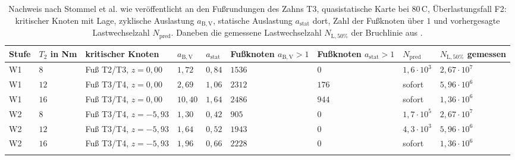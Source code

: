\begin{table}[htbp]
    \caption{Nachweis nach Stommel et al. wie veröffentlicht an den Fußrundungen des Zahns T3, quasistatische Karte bei $80$\,\textdegree C, Überlastungsfall F2: kritischer Knoten mit Lage, zyklische Auslastung $a_{\mathrm{B,V}}$, statische Auslastung $a_{\mathrm{stat}}$ dort, Zahl der Fußknoten über $1$ und vorhergesagte Lastwechselzahl $N_{\mathrm{pred}}$. Daneben die gemessene Lastwechselzahl $N_{\mathrm{L},50\%}$ der Bruchlinie aus .}
    \label{tab:stommel_veroeffentlicht}
    \centering
    \footnotesize
    \setlength{\tabcolsep}{4pt}
    \begin{tabular}{L{0.8cm}L{1.0cm}L{2.9cm}L{1.1cm}L{1.1cm}L{1.5cm}L{1.5cm}L{1.5cm}L{1.8cm}}
        Stufe & $T_{2}$ in Nm & kritischer Knoten        & $a_{\mathrm{B,V}}$ & $a_{\mathrm{stat}}$ & Fußknoten $a_{\mathrm{B,V}} > 1$ & Fußknoten $a_{\mathrm{stat}} > 1$ & $N_{\mathrm{pred}}$  & $N_{\mathrm{L},50\%}$ gemessen \\
        \hline
        W1    & $8$           & Fuß T2/T3, $z = 0{,}00$  & $1{,}72$           & $0{,}84$            & $1536$                           & $0$                               & $1{,}6 \cdot 10^{3}$ & $2{,}67 \cdot 10^{7}$          \\
        \hline
        W1    & $12$          & Fuß T3/T4, $z = 0{,}00$  & $2{,}69$           & $1{,}06$            & $2312$                           & $176$                             & sofort               & $5{,}96 \cdot 10^{6}$          \\
        \hline
        W1    & $16$          & Fuß T3/T4, $z = 0{,}00$  & $10{,}40$          & $1{,}64$            & $2486$                           & $944$                             & sofort               & $1{,}36 \cdot 10^{6}$          \\
        \hline
        W2    & $8$           & Fuß T3/T4, $z = -5{,}93$ & $1{,}30$           & $0{,}42$            & $905$                            & $0$                               & $1{,}7 \cdot 10^{5}$ & $2{,}67 \cdot 10^{7}$          \\
        \hline
        W2    & $12$          & Fuß T3/T4, $z = -5{,}93$ & $1{,}64$           & $0{,}52$            & $1943$                           & $0$                               & $4{,}3 \cdot 10^{3}$ & $5{,}96 \cdot 10^{6}$          \\
        \hline
        W2    & $16$          & Fuß T3/T4, $z = -5{,}93$ & $1{,}96$           & $0{,}66$            & $2228$                           & $0$                               & sofort               & $1{,}36 \cdot 10^{6}$          \\
        \hline
    \end{tabular}
\end{table}

